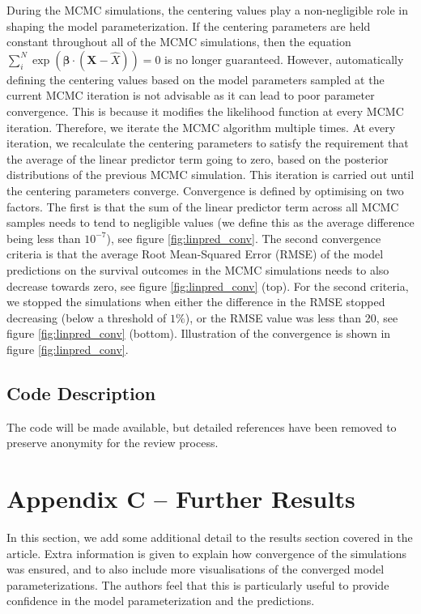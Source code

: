 \documentclass[
]{article}
\begin{document}
During the MCMC simulations, the centering values play a non-negligible role in shaping the model parameterization. If the centering parameters are held constant throughout all of the MCMC simulations, then the equation \(\sum_i^N \exp{(\boldsymbol{\beta}\cdot(\boldsymbol{X}-\hat{X}))}=0\) is no longer guaranteed. However, automatically defining the centering values based on the model parameters sampled at the current MCMC iteration is not advisable as it can lead to poor parameter convergence. This is because it modifies the likelihood function at every MCMC iteration. Therefore, we iterate the MCMC algorithm multiple times. At every iteration, we recalculate the centering parameters to satisfy the requirement that the average of the linear predictor term going to zero, based on the posterior distributions of the previous MCMC simulation. This iteration is carried out until the centering parameters converge. Convergence is defined by optimising on two factors. The first is that the sum of the linear predictor term across all MCMC samples needs to tend to negligible values (we define this as the average difference being less than \(10^{-7}\)), see figure \ref{fig:linpred_conv}. The second convergence criteria is that the average Root Mean-Squared Error (RMSE) of the model predictions on the survival outcomes in the MCMC simulations needs to also decrease towards zero, see figure \ref{fig:linpred_conv} (top). For the second criteria, we stopped the simulations when either the difference in the RMSE stopped decreasing (below a threshold of \(1\%\)), or the RMSE value was less than 20, see figure \ref{fig:linpred_conv} (bottom). Illustration of the convergence is shown in figure \ref{fig:linpred_conv}.

\newpage

\subsection{Code Description}\label{code-description}

The code will be made available, but detailed references have been removed to preserve anonymity for the review process.

\section{Appendix C -- Further Results}\label{appendix-c-further-results}

In this section, we add some additional detail to the results section covered in the article. Extra information is given to explain how convergence of the simulations was ensured, and to also include more visualisations of the converged model parameterizations. The authors feel that this is particularly useful to provide confidence in the model parameterization and the predictions.
\end{document}
